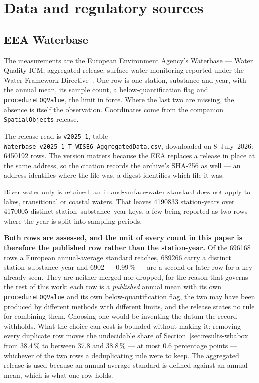 \section{Data and regulatory sources}
\label{sec:materials}

\subsection{EEA Waterbase}
The measurements are the European Environment Agency's Waterbase --- Water
Quality ICM, aggregated release: surface-water monitoring reported under the
Water Framework Directive~\cite{eea_waterbase,eu2000wfd}. One row is one
station, substance and year, with the annual mean, its sample count, a
below-quantification flag and \texttt{procedureLOQValue}, the limit in force.
Where the last two are missing, the absence is itself the observation.
Coordinates come from the companion \texttt{SpatialObjects} release.

The release read is \texttt{v2025\_1}, table
\texttt{Waterbase\_v2025\_1\_T\_WISE6\_AggregatedData.csv}, downloaded on
\num{8}~July~\num{2026}: \num{6450192} rows. The version matters because the
EEA replaces a release in place at the same address, so the citation records the
archive's SHA-256 as well --- an address identifies where the file was, a digest
identifies which file it was.

River water only is retained: an inland-surface-water standard does not apply to
lakes, transitional or coastal waters. That leaves \num{4190833} station-years
over \num{4170005} distinct station--substance--year keys, a few being reported
as two rows where the year is split into sampling periods.

\textbf{Both rows are assessed, and the unit of every count in this paper is
therefore the published row rather than the station-year.} Of the
\num{696168} rows a European annual-average standard reaches,
\num{689266} carry a distinct station--substance--year and \num{6902}
--- \num{0.99}\,\% --- are a second or later row for a key already
seen. They are neither merged nor
dropped, for the reason that governs the rest of this work: each row is a
\emph{published} annual mean with its own \texttt{procedureLOQValue} and its
own below-quantification flag, the two may have been produced by different
methods with different limits, and the release states no rule for combining
them. Choosing one would be inventing the datum the record withholds. What the
choice can cost is bounded without making it: removing every duplicate row
moves the undecidable share of Section~\ref{sec:results-wbabox} from
\num{38.4}\,\% to between \num{37.8} and \num{38.8}\,\% --- at most
\num{0.6} percentage points --- whichever of the two rows a deduplicating
rule were to keep. The aggregated
release is used because an annual-average standard is defined against an annual
mean, which is what one row holds.

